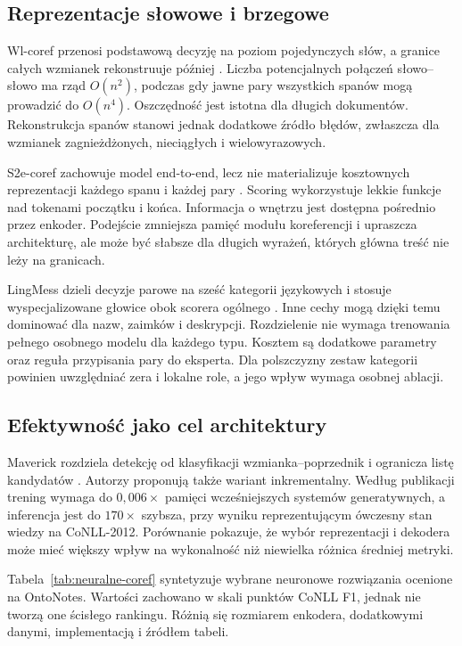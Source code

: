\subsection{Reprezentacje słowowe i brzegowe}

Wl-coref przenosi podstawową decyzję na poziom pojedynczych słów, a granice całych wzmianek rekonstruuje później \cite{dobrovolskii_2021_word}. Liczba potencjalnych połączeń słowo--słowo ma rząd $O(n^2)$, podczas gdy jawne pary wszystkich spanów mogą prowadzić do $O(n^4)$. Oszczędność jest istotna dla długich dokumentów. Rekonstrukcja spanów stanowi jednak dodatkowe źródło błędów, zwłaszcza dla wzmianek zagnieżdżonych, nieciągłych i wielowyrazowych.

S2e-coref zachowuje model end-to-end, lecz nie materializuje kosztownych reprezentacji każdego spanu i każdej pary \cite{kirstain_2021_s2e}. Scoring wykorzystuje lekkie funkcje nad tokenami początku i końca. Informacja o wnętrzu jest dostępna pośrednio przez enkoder. Podejście zmniejsza pamięć modułu koreferencji i upraszcza architekturę, ale może być słabsze dla długich wyrażeń, których główna treść nie leży na granicach.

LingMess dzieli decyzje parowe na sześć kategorii językowych i stosuje wyspecjalizowane głowice obok scorera ogólnego \cite{otmazgin_2023_lingmess}. Inne cechy mogą dzięki temu dominować dla nazw, zaimków i deskrypcji. Rozdzielenie nie wymaga trenowania pełnego osobnego modelu dla każdego typu. Kosztem są dodatkowe parametry oraz reguła przypisania pary do eksperta. Dla polszczyzny zestaw kategorii powinien uwzględniać zera i lokalne role, a jego wpływ wymaga osobnej ablacji.

\subsection{Efektywność jako cel architektury}

Maverick rozdziela detekcję od klasyfikacji wzmianka--poprzednik i ogranicza listę kandydatów \cite{martinelli_2024_maverick}. Autorzy proponują także wariant inkrementalny. Według publikacji trening wymaga do $0{,}006\times$ pamięci wcześniejszych systemów generatywnych, a inferencja jest do $170\times$ szybsza, przy wyniku reprezentującym ówczesny stan wiedzy na CoNLL-2012. Porównanie pokazuje, że wybór reprezentacji i dekodera może mieć większy wpływ na wykonalność niż niewielka różnica średniej metryki.

Tabela~\ref{tab:neuralne-coref} syntetyzuje wybrane neuronowe rozwiązania ocenione na OntoNotes. Wartości zachowano w skali punktów CoNLL F1, jednak nie tworzą one ścisłego rankingu. Różnią się rozmiarem enkodera, dodatkowymi danymi, implementacją i źródłem tabeli.

